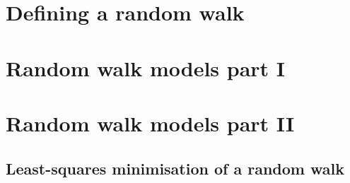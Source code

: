 \documentclass[../full_thesis/full_thesis.tex]{subfiles}
\newcommand{\thisdir}{../analytic_timing_noise_cgw}
\begin{document}
\section{Defining a random walk}
\label{sec: Defining a random walk}


\section{Random walk models part I}
\label{sec: Random walk models part I}


\section{Random walk models part II} 
\label{sec: Random walk models part II}


\begin{subappendices}


\section{Least-squares minimisation of a random walk}
\label{sec: least squares minimisation of a random walk}



\end{subappendices}


\biblio
\end{document}
